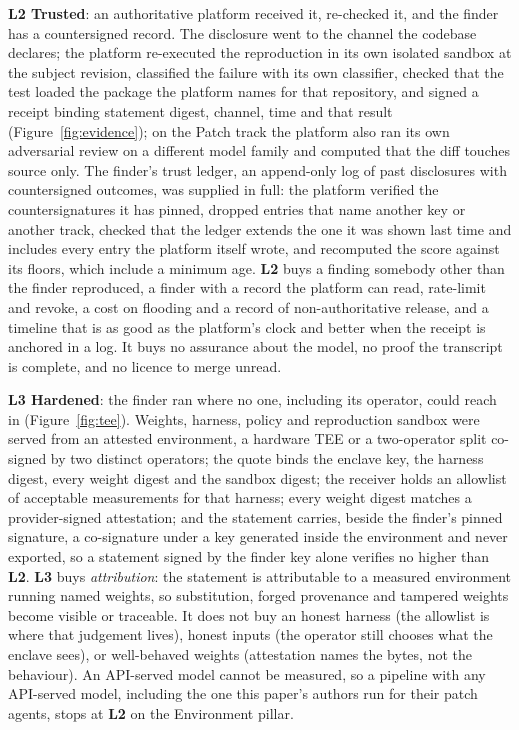 \documentclass[11pt]{article}
\newcommand{\lvl}[1]{\textbf{L#1}}
\begin{document}
\textbf{\lvl{2} Trusted}: an authoritative platform received it, re-checked it, and the finder has a
countersigned record. The disclosure went to the channel the codebase declares; the platform re-executed the
reproduction in its own isolated sandbox at the subject revision, classified the failure with its own
classifier, checked that the test loaded the package the platform names for that repository, and signed a receipt
binding statement digest, channel, time and that result (Figure~\ref{fig:evidence}); on the Patch track the
platform also ran its own adversarial review on a different model family and computed that the diff touches source
only. The finder's trust ledger, an append-only log of past disclosures with countersigned outcomes, was supplied in
full: the platform verified the countersignatures it has pinned, dropped entries that name another key or another
track, checked that the ledger extends the one it was shown last time and includes every entry the platform itself
wrote, and recomputed the score against its floors, which include a minimum age. \lvl{2} buys a finding somebody other than the
finder reproduced, a finder with a record the platform can read, rate-limit and revoke, a cost on flooding and
a record of non-authoritative release, and a timeline that is as good as the platform's clock and better when
the receipt is anchored in a log. It buys no assurance about the model, no proof the transcript is complete,
and no licence to merge unread.

\textbf{\lvl{3} Hardened}: the finder ran where no one, including its operator, could reach in
(Figure~\ref{fig:tee}). Weights, harness, policy and reproduction sandbox were served from an attested
environment, a hardware TEE or a two-operator split co-signed by two distinct operators; the quote binds the
enclave key, the harness digest, every weight digest and the sandbox digest; the receiver holds an allowlist of
acceptable measurements for that harness; every weight digest matches a provider-signed attestation; and the
statement carries, beside the finder's pinned signature, a co-signature under a key generated inside the
environment and never exported, so a statement signed by the finder key alone verifies no higher than \lvl{2}. \lvl{3} buys \emph{attribution}: the statement is attributable to a measured
environment running named weights, so substitution, forged provenance and tampered weights become visible or
traceable. It does not buy an honest harness (the allowlist is where that judgement lives), honest inputs (the
operator still chooses what the enclave sees), or well-behaved weights (attestation names the bytes, not the
behaviour). An API-served model cannot be measured, so a pipeline with any API-served model, including the
one this paper's authors run for their patch agents, stops at \lvl{2} on the Environment pillar.
\end{document}
